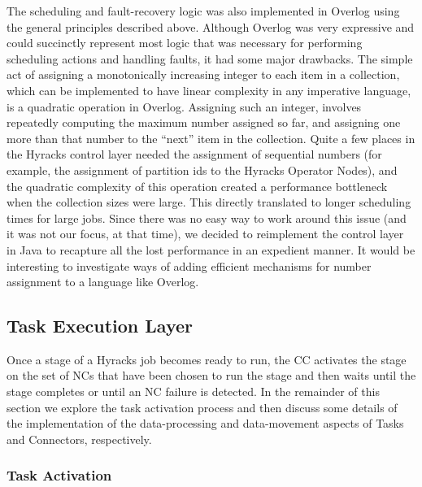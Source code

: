 The scheduling and fault-recovery logic was also implemented in Overlog using the general principles described above. Although Overlog was very expressive and could succinctly represent most logic that was necessary for performing scheduling actions and handling faults, it had some major drawbacks. The simple act of assigning a monotonically increasing integer to each item in a collection, which can be implemented to have linear complexity in any imperative language, is a quadratic operation in Overlog. Assigning such an integer, involves repeatedly computing the maximum number assigned so far, and assigning one more than that number to the ``next'' item in the collection. Quite a few places in the Hyracks control layer needed the assignment of sequential numbers (for example, the assignment of partition ids to the Hyracks Operator Nodes), and the quadratic complexity of this operation created a performance bottleneck when the collection sizes were large. This directly translated to longer scheduling times for large jobs. Since there was no easy way to work around this issue (and it was not our focus, at that time), we decided to reimplement the control layer in Java to recapture all the lost performance in an expedient manner. It would be interesting to investigate ways of adding efficient mechanisms for number assignment to a language like Overlog.

\subsection{Task Execution Layer}

Once a stage of a Hyracks job becomes ready to run,
the CC activates the stage on the set of NCs that have been chosen to run the stage and then waits until the stage completes or until an NC failure is detected.
In the remainder of this section we explore the task activation process and then discuss some details of the implementation of the data-processing and data-movement
aspects of Tasks and Connectors, respectively.

\subsubsection{Task Activation}

